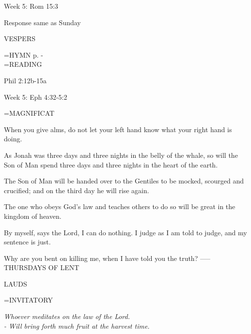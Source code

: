 Week 5:    Rom 15:3    

Response same as Sunday

\begin{flushleft}\normalsize VESPERS\\\end{flushleft}
\hangindent=\parindent \small{\uppercase{HYMN} p. \pageref{lent:firstHymn}-\pageref{lent:lastHymn}\\}
\hangindent=\parindent \small READING
\begin{description}[labelindent=\parindent, leftmargin=*]
\item [Ash Wednesday \& Weeks 1-4:]     Phil 2:12b-15a \textbf{\\}
\end{description}

Week 5:    Eph 4:32-5:2    

\hangindent=\parindent \small MAGNIFICAT
\begin{description}[labelindent=\parindent, leftmargin=*]
\item [Ash Wednesday:] 	When you give alms, do not let your left hand know what your right hand is doing.
\item [Week 1:] 	As Jonah was three days and three nights in the belly of the whale, so will the Son of Man spend three days and three nights in the heart of the earth.
\item [Week 2:] 	The Son of Man will be handed over to the Gentiles to be mocked, scourged and crucified; and on the third day he will rise again.
\item [Week 3:] 	The one who obeys God's law and teaches others to do so will be great in the kingdom of heaven.
\item [Week 4:] 	By myself, says the Lord, I can do nothing. I judge as I am told to judge, and my sentence is just.
\item [Week 5:] 	Why are you bent on killing me, when I have told you the truth?
-----
THURSDAYS OF LENT
\end{description}

\begin{flushleft}\normalsize LAUDS\\\end{flushleft}
\hangindent=\parindent \small{INVITATORY}
\begin{center}
\textit{Whoever meditates on the law of the Lord.\\}
\textit{- Will bring forth much fruit at the harvest time.\\}
\end{center}

